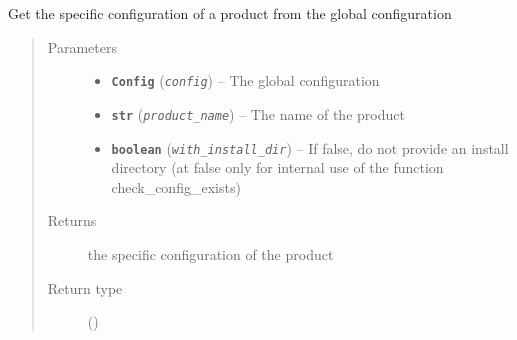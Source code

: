 \documentclass[a4paper,10pt,english]{sphinxmanual}
\begin{document}

\begin{fulllineitems}
\label{commands/apidoc/src:src.product.get_product_config}
Get the specific configuration of a product from the global configuration
\begin{quote}\begin{description}
\item[{Parameters}] \leavevmode\begin{itemize}
\item {} 
\textbf{\texttt{Config}} (\emph{\texttt{config}}) -- The global configuration

\item {} 
\textbf{\texttt{str}} (\emph{\texttt{product\_name}}) -- The name of the product

\item {} 
\textbf{\texttt{boolean}} (\emph{\texttt{with\_install\_dir}}) -- If false, do not provide an install 
directory (at false only for internal use 
of the function check\_config\_exists)

\end{itemize}

\item[{Returns}] \leavevmode
the specific configuration of the product

\item[{Return type}] \leavevmode
{\hyperref[commands/apidoc/src:src.pyconf.Config]{}} ()

\end{description}\end{quote}

\end{fulllineitems}

\end{document}
